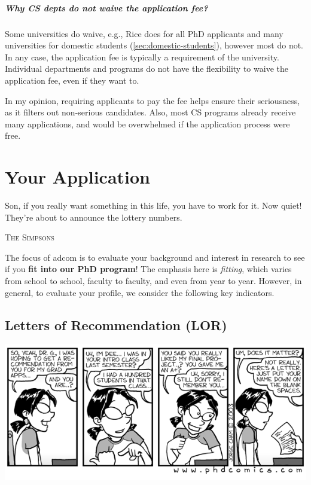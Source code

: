 \documentclass[oneside,11pt,dvipsnames]{book}
\newcommand{\mycomment}[3][\color{blue}]{{#1{{#2}: {#3}}}}
\newcommand{\didi}[1]{\mycomment{Didier}{#1}}{}
\begin{document}


\paragraph{Why CS depts do not waive the application fee?}  Some universities do waive, e.g., Rice does for all PhD applicants and many universities for domestic students (\autoref{sec:domestic-students}), however most do not.  In any case, the application fee is typically a requirement of the university. Individual departments and programs do not have the flexibility to waive the application fee, even if they want to.

In my opinion, requiring applicants to pay the fee helps ensure their seriousness, as it filters out non-serious candidates. Also, most CS programs already receive many applications, and would be overwhelmed if the application process were free.  


\chapter{Your Application}\label{sec:application}

\epigraph{Son, if you really want something in this life, you have to work for it. Now quiet! They’re about to announce the lottery numbers.}{\textsc{The Simpsons}}


The focus of adcom is to evaluate your background and interest in research to see if you \textbf{fit into our PhD program}! The emphasis here is \emph{fitting}, which varies from school to school, faculty to faculty, and even from year to year.  However, in general, to evaluate your profile, we consider the following key indicators.


\section{Letters of Recommendation (LOR)}\label{sec:lor}

\begin{center}
  \includegraphics[width=0.6\linewidth]{files/c6.png}
\end{center}
\end{document}
